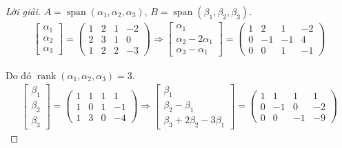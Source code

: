 \begin{proof}[Lời giải]
    $A = \operatorname{span}(\alpha_{1},\alpha_{2},\alpha_{3})$, $B = \operatorname{span}(\beta_{1},\beta_{2},\beta_{3})$.
    \begin{align*}
        \begin{bmatrix}
            \alpha_{1} \\
            \alpha_{2} \\
            \alpha_{3}
        \end{bmatrix}=
        \begin{pmatrix}
            1 & 2 & 1 & -2 \\
            2 & 3 & 1 & 0  \\
            1 & 2 & 2 & -3
        \end{pmatrix}
        \Longrightarrow
        \begin{bmatrix}
            \alpha_{1}               \\
            \alpha_{2} - 2\alpha_{1} \\
            \alpha_{3} - \alpha_{1}
        \end{bmatrix}=
        \begin{pmatrix}
            1 & 2  & 1  & -2 \\
            0 & -1 & -1 & 4  \\
            0 & 0  & 1  & -1
        \end{pmatrix}
    \end{align*}
    
    Do đó $\operatorname{rank}(\alpha_{1}, \alpha_{2}, \alpha_{3}) = 3$.
    \begin{align*}
        \begin{bmatrix}
            \beta_{1} \\
            \beta_{2} \\
            \beta_{3}
        \end{bmatrix}=
        \begin{pmatrix}
            1 & 1 & 1 & 1  \\
            1 & 0 & 1 & -1 \\
            1 & 3 & 0 & -4
        \end{pmatrix}
        \Longrightarrow
        \begin{bmatrix}
            \beta_{1}             \\
            \beta_{2} - \beta_{1} \\
            \beta_{3} + 2\beta_{2} - 3\beta_{1}
        \end{bmatrix}=
        \begin{pmatrix}
            1 & 1  & 1  & 1  \\
            0 & -1 & 0  & -2 \\
            0 & 0  & -1 & -9
        \end{pmatrix}
    \end{align*}
    

\end{proof}
